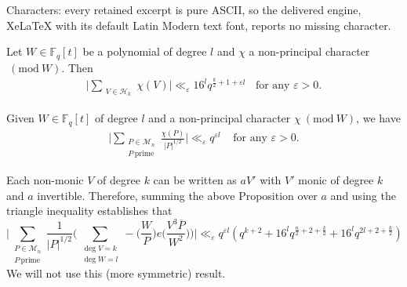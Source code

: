 \documentclass[10pt,a4paper]{amsart}
\newcommand{\BF}{\mathbb{F}}
\newcommand{\CH}{\mathcal{H}}
\newcommand{\CM}{\mathcal{M}}
\newcommand{\Mod}[1]{\ (\mathrm{mod}\ #1)}
\begin{document}
Characters: every retained excerpt is pure ASCII, so the delivered engine, XeLaTeX with its default Latin Modern text font, reports no missing character.
\begin{lem}\label{sumofchi}%
    Let $W \in \BF_q[t]$ be a polynomial of degree $l$ and $\chi$ a non-principal character$\Mod W$.  Then
    \begin{align*}
        \Big | \sum_{\substack{ V \in  \CH_{k} }} \chi(V) \Big | \ll_{\varepsilon} 16^l q^{\frac{k}{2} + 1  + \varepsilon l} \ \ \ \ \text{for any $\varepsilon > 0 $}.
    \end{align*}
\end{lem}

\begin{lem}\label{sumofchioverprimes}
    Given $W \in \BF_{q}[t]$ of degree $l$ and a non-principal character $\chi \Mod{W}$, we have
    \begin{align*}
        \Big | \sum_{\substack{P \in \CM_{n} \\ P \ \text{prime} }} \frac{\chi(P) }{|P|^{1/2}} \Big |  \ll_{\varepsilon} q^{\varepsilon l} \ \ \ \ \ \text{for any $\varepsilon > 0$}.
    \end{align*}
\end{lem}

\begin{rem}
Each non-monic $V$ of degree $k$ can be written as $a V'$ with $V'$ monic of degree $k$ and $a$ invertible. Therefore, summing the above Proposition over $a$ and using the triangle inequality establishes that
$$
\Big |  \sum_{\substack{P \in \CM_{n} \\ P \ \text{prime}}} \frac{1}{|P|^{1/2}} \Big (\sum_{\substack{\deg V =k \\ \deg W =l}} - \Big (\frac{W}{P} \Big ) e\Big ( \frac{V^3\overline{P}}{W^2} \Big ) \Big) \Big | \ll_\varepsilon q^{\varepsilon l } ( q^{k+2}+ 16^{l} q^{\frac{n}{2} + 2 + \frac{k}{2}} + 16^{l} q^{2l + 2+ \frac{k}{2}}  )
$$
We will not use this (more symmetric) result. 
\end{rem}
\end{document}
